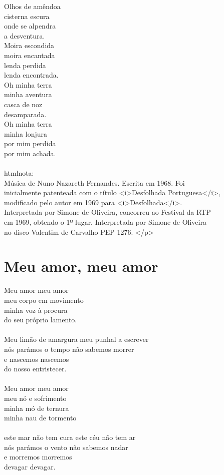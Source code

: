 \documentclass{article}
\begin{document}
Olhos de amêndoa \\
cisterna escura \\
onde se alpendra \\
a desventura. \\
Moira escondida \\
moira encantada \\
lenda perdida \\
lenda encontrada. \\
Oh minha terra \\
minha aventura \\
casca de noz \\
desamparada. \\
Oh minha terra \\
minha lonjura \\
por mim perdida \\
por mim achada. \\
\\
htmlnota:\\
Música de Nuno Nazareth Fernandes. Escrita em 1968. Foi\\
inicialmente patenteada com o título <i>Desfolhada Portuguesa</i>,\\
modificado pelo autor em 1969 para <i>Desfolhada</i>.\\
Interpretada por Simone de Oliveira, concorreu ao Festival da RTP\\
em 1969, obtendo o 1º lugar. Interpretada por Simone de Oliveira\\
no disco Valentim de Carvalho PEP 1276. </p>\\
\section{ Meu amor, meu amor}
Meu amor meu amor\\
meu corpo em movimento\\
minha voz à procura\\
do seu próprio lamento.\\
\\
Meu limão de amargura meu punhal a escrever\\
nós parámos o tempo não sabemos morrer\\
e nascemos nascemos\\
do nosso entristecer.\\
\\
Meu amor meu amor\\
meu nó e sofrimento\\
minha mó de ternura\\
minha nau de tormento\\
\\
este mar não tem cura este céu não tem ar\\
nós parámos o vento não sabemos nadar\\
e morremos morremos\\
devagar devagar.\\
\end{document}
